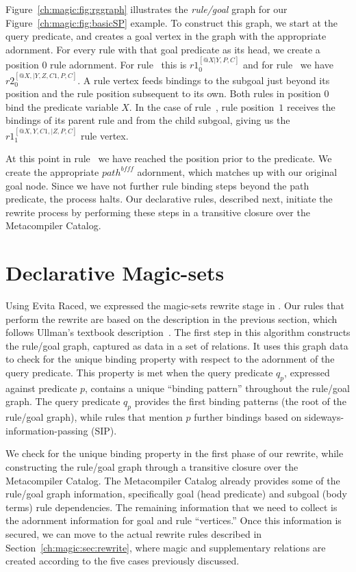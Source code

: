 Figure~\ref{ch:magic:fig:rggraph} illustrates the {\em rule/goal} graph for our
Figure~\ref{ch:magic:fig:basicSP} example.  To construct this graph, we start
at the query predicate, and creates a goal vertex in the graph with the
appropriate adornment.  For every rule with that goal predicate as its head, we
create a position $0$ rule adornment.  For rule~ this is
$r1_0^{[@X|Y,P,C]}$ and for rule~ we have $r2_0^{[@X,|Y,Z,C1,P,C]}$.  A
rule vertex feeds bindings to the subgoal just beyond its position and the rule
position subsequent to its own.  Both rules in position $0$ bind the 
predicate variable $X$.  In the case of rule~, rule position~$1$
receives the bindings of its parent rule and from the  child subgoal,
giving us the $r1_1^{[@X,Y,C1,|Z,P,C]}$ rule vertex.

At this point in rule~ we have reached the position prior to the
 predicate.  We create the appropriate $path^{bfff}$ adornment, which
matches up with our original  goal node.  Since we have not further
rule binding steps beyond the path predicate, the process halts.  Our
declarative rules, described next, initiate the rewrite process by performing
these steps in a transitive closure over the Metacompiler Catalog.

\section{Declarative Magic-sets}
\label{ch:magic:sec:rules}

Using Evita Raced, we expressed the magic-sets rewrite stage in \OVERLOG.  Our
\OVERLOG rules that perform the rewrite are based on the description in the
previous section, which follows Ullman's textbook
description~\cite{ullmanTextbook}.  The first step in this algorithm constructs
the rule/goal graph, captured as data in a set of relations.  It uses this
graph data to check for the {\emph unique binding property} with respect to the
adornment of the query predicate.  This property is met when the query
predicate $q_p$, expressed against predicate $p$, contains a unique ``binding
pattern'' throughout the rule/goal graph.  The query predicate $q_p$ provides
the first binding patterns (the root of the rule/goal graph), while rules that
mention $p$ further bindings based on sideways-information-passing (SIP).

We check for the unique binding property in the first phase of our rewrite,
while constructing the rule/goal graph through a transitive closure over the
Metacompiler Catalog.  The Metacompiler Catalog already provides some of the
rule/goal graph information, specifically goal (head predicate) and subgoal
(body terms) rule dependencies.  The remaining information that we need to
collect is the adornment information for goal and rule ``vertices.''  Once this
information is secured, we can move to the actual rewrite rules
described in Section~\ref{ch:magic:sec:rewrite}, where magic and supplementary
relations are created according to the five cases previously discussed.

